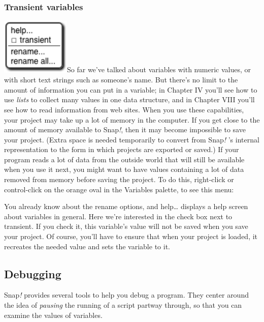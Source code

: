 \subsubsection{Transient variables}\label{transient-variables}

\includegraphics[width=1.29167in,height=1.05556in]{media/image114.png}So
far we've talked about variables with numeric values, or with short text
strings such as someone's name. But there's no limit to the amount of
information you can put in a variable; in Chapter IV you'll see how to
use \emph{lists} to collect many values in one data structure, and in
Chapter VIII you'll see how to read information from web sites. When you
use these capabilities, your project may take up a lot of memory in the
computer. If you get close to the amount of memory available to
Snap\emph{!}, then it may become impossible to save your project. (Extra
space is needed temporarily to convert from Snap\emph{!} 's internal
representation to the form in which projects are exported or saved.) If
your program reads a lot of data from the outside world that will still
be available when you use it next, you might want to have values
containing a lot of data removed from memory before saving the project.
To do this, right-click or control-click on the orange oval in the
Variables palette, to see this menu:

You already know about the rename options, and help\ldots{} displays a
help screen about variables in general. Here we're interested in the
check box next to transient. If you check it, this variable's value will
not be saved when you save your project. Of course, you'll have to
ensure that when your project is loaded, it recreates the needed value
and sets the variable to it.

\subsection{Debugging}\label{debugging}

Snap\emph{!} provides several tools to help you debug a program. They
center around the idea of \emph{pausing} the running of a script partway
through, so that you can examine the values of variables.

